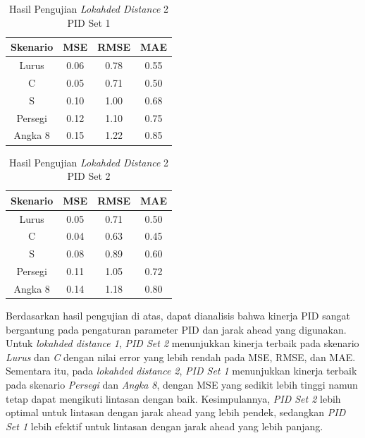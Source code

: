     \begin{table}[H]
    \centering
    \caption{Hasil Pengujian \emph{Lokahded Distance} 2 PID Set 1}
    \label{tab:hasil_lokahded_distance_2_pid_set_1}
    \begin{tabular}{|c|c|c|c|}
    \hline
    \textbf{Skenario} & \textbf{MSE} & \textbf{RMSE} & \textbf{MAE} \\ \hline
    Lurus          & 0.06  & 0.78  & 0.55  \\
    C              & 0.05  & 0.71  & 0.50  \\
    S              & 0.10  & 1.00  & 0.68  \\
    Persegi        & 0.12  & 1.10  & 0.75  \\
    Angka 8        & 0.15  & 1.22  & 0.85  \\
    \hline
    \end{tabular}
    \end{table}
    
    \begin{table}[H]
    \centering
    \caption{Hasil Pengujian \emph{Lokahded Distance} 2 PID Set 2}
    \label{tab:hasil_lokahded_distance_2_pid_set_2}
    \begin{tabular}{|c|c|c|c|}
    \hline
    \textbf{Skenario} & \textbf{MSE} & \textbf{RMSE} & \textbf{MAE} \\ \hline
    Lurus          & 0.05  & 0.71  & 0.50  \\
    C              & 0.04  & 0.63  & 0.45  \\
    S              & 0.08  & 0.89  & 0.60  \\
    Persegi        & 0.11  & 1.05  & 0.72  \\
    Angka 8        & 0.14  & 1.18  & 0.80  \\
    \hline
    \end{tabular}
    \end{table}
    
  
  Berdasarkan hasil pengujian di atas, dapat dianalisis bahwa kinerja PID sangat bergantung pada pengaturan parameter PID dan jarak ahead yang digunakan. Untuk \emph{lokahded distance 1}, \emph{PID Set 2} menunjukkan kinerja terbaik pada skenario \emph{Lurus} dan \emph{C} dengan nilai error yang lebih rendah pada MSE, RMSE, dan MAE. Sementara itu, pada \emph{lokahded distance 2}, \emph{PID Set 1} menunjukkan kinerja terbaik pada skenario \emph{Persegi} dan \emph{Angka 8}, dengan MSE yang sedikit lebih tinggi namun tetap dapat mengikuti lintasan dengan baik. Kesimpulannya, \emph{PID Set 2} lebih optimal untuk lintasan dengan jarak ahead yang lebih pendek, sedangkan \emph{PID Set 1} lebih efektif untuk lintasan dengan jarak ahead yang lebih panjang.
  
